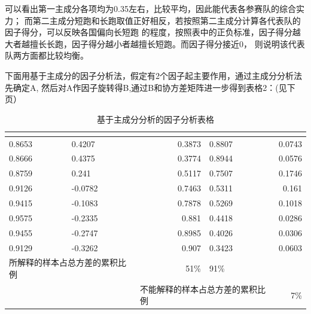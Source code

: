 \documentclass[10pt]{article}
\begin{document}
\begin{CJK}{GBK}{song}
可以看出第一主成分各项均为0.35左右，比较平均，因此能代表各参赛队的综合实力；
而第二主成分短跑和长跑取值正好相反，若按照第二主成分计算各代表队的因子得分，可以反映各国偏向长短跑
的程度，按照表中的正负标准，因子得分越大者越擅长长跑，因子得分越小者越擅长短跑。而因子得分接近0，
则说明该代表队两方面都比较均衡。

下面用基于主成分的因子分析法，假定有2个因子起主要作用，通过主成分分析法先确定A,
然后对A作因子旋转得B,通过B和协方差矩阵进一步得到表格2：(见下页）
\begin{table}[htbp]
  \centering
  \caption{基于主成分分析的因子分析表格}
    \begin{tabular}{llrlr}
    \hline
    \multicolumn{1}{l}{} & \multicolumn{1}{l}{} & \multicolumn{2}{l}{} & \multicolumn{1}{l}{} \\
    \hline
    0.8653 & 0.4207        & 0.3873 & 0.8807        & 0.0743 \\
    0.8666 & 0.4375        & 0.3774 & 0.8944        & 0.0576 \\
    0.8759 & 0.241       & 0.5117 & 0.7507        & 0.1746 \\
    0.9126 & -0.0782        & 0.7463 & 0.5311       & 0.161 \\
    0.9415 & -0.1083        & 0.7878 & 0.5269        & 0.1018 \\
    0.9575 & -0.2335        & 0.881 & 0.4418        & 0.0286 \\
    0.9455 & -0.2747        & 0.8985 & 0.4026        & 0.0306 \\
    0.9129 & -0.3262        & 0.907 & 0.3423        & 0.0603 \\
    \hline
   \multicolumn{2}{l}{所解释的样本占总方差的累积比例}  & 51\%  & 91\%  & \\
   \hline
   & & \multicolumn{2}{l}{不能解释的样本占总方差的累积比例}  & 7\%\\
   \hline
    \end{tabular}%
\end{table}%


\end{CJK}
\end{document}

